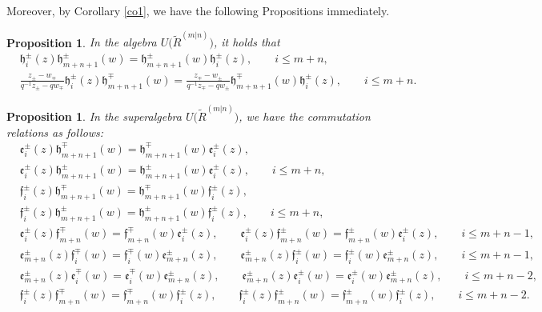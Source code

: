 \documentclass[pdftex]{sigma}
\numberwithin{equation}{section}
\newtheorem{Proposition}[Theorem]{Proposition}
 { \theoremstyle{definition}
\newtheorem{Definition}[Theorem]{Definition}
\newtheorem{Note}[Theorem]{Note}
\newtheorem{Example}[Theorem]{Example}
\newtheorem{Remark}[Theorem]{Remark} }
\begin{document}
Moreover, by Corollary \ref{co1}, we have the following Propositions immediately.
\begin{Proposition}In the algebra $U\bigl(\widetilde{R}^{(m|n)}\bigr)$, it holds that
\begin{align*}
&\mathfrak{h}_i^{\pm}(z)\mathfrak{h}_{m+n+1}^{\pm}(w)=\mathfrak{h}_{m+n+1}^{\pm}(w)\mathfrak{h}_i^{\pm}(z),\qquad i\leq m+n,\\
&\frac{z_{\pm}-w_{\mp}}{q^{-1}z_{\pm}-qw_{\mp}}\mathfrak{h}_i^{\pm}(z)\mathfrak{h}_{m+n+1}^{\mp}(w)=\frac{z_{\mp}-w_{\pm}}{q^{-1}z_{\mp}-qw_{\pm}}\mathfrak{h}_{m+n+1}^{\mp}(w)\mathfrak{h}_i^{\pm}(z),\qquad i\leq m+n.
\end{align*}
\end{Proposition}
\begin{Proposition}In the superalgebra $U\bigl(\widetilde{R}^{(m|n)}\bigr)$, we have the commutation relations as follows:
\begin{align*}
&\mathfrak{e}_i^{\pm}(z)\mathfrak{h}_{m+n+1}^{\mp}(w)=\mathfrak{h}_{m+n+1}^{\mp}(w)\mathfrak{e}_i^{\pm}(z),\\ &\mathfrak{e}_i^{\pm}(z)\mathfrak{h}_{m+n+1}^{\pm}(w)=\mathfrak{h}_{m+n+1}^{\pm}(w)\mathfrak{e}_i^{\pm}(z),\qquad i\leq m+n,\\
&\mathfrak{f}_i^{\pm}(z)\mathfrak{h}_{m+n+1}^{\mp}(w)=\mathfrak{h}_{m+n+1}^{\mp}(w)\mathfrak{f}_i^{\pm}(z),\\ &\mathfrak{f}_i^{\pm}(z)\mathfrak{h}_{m+n+1}^{\pm}(w)=\mathfrak{h}_{m+n+1}^{\pm}(w)\mathfrak{f}_i^{\pm}(z),\qquad i\leq m+n,\\
&\mathfrak{e}_i^{\pm}(z)\mathfrak{f}_{m+n}^{\mp}(w)=\mathfrak{f}_{m+n}^{\mp}(w)\mathfrak{e}_i^{\pm}(z),\qquad \mathfrak{e}_i^{\pm}(z)\mathfrak{f}_{m+n}^{\pm}(w)=\mathfrak{f}_{m+n}^{\pm}(w)\mathfrak{e}_i^{\pm}(z),\qquad i\leq m+n-1,\\
&\mathfrak{e}_{m+n}^{\pm}(z)\mathfrak{f}_i^{\mp}(w)=\mathfrak{f}_i^{\mp}(w)\mathfrak{e}_{m+n}^{\pm}(z),\qquad \mathfrak{e}_{m+n}^{\pm}(z)\mathfrak{f}_i^{\pm}(w)=\mathfrak{f}_i^{\pm}(w)\mathfrak{e}_{m+n}^{\pm}(z), \qquad i\leq m+n-1,\\
&\mathfrak{e}_{m+n}^{\pm}(z)\mathfrak{e}_i^{\mp}(w)=\mathfrak{e}_i^{\mp}(w)\mathfrak{e}_{m+n}^{\pm}(z),\qquad \mathfrak{e}_{m+n}^{\pm}(z)\mathfrak{e}_i^{\pm}(w)=\mathfrak{e}_i^{\pm}(w)\mathfrak{e}_{m+n}^{\pm}(z), \qquad i\leq m+n-2,\\
&\mathfrak{f}_i^{\pm}(z)\mathfrak{f}_{m+n}^{\mp}(w)=\mathfrak{f}_{m+n}^{\mp}(w)\mathfrak{f}_i^{\pm}(z),\qquad \mathfrak{f}_i^{\pm}(z)\mathfrak{f}_{m+n}^{\pm}(w)=\mathfrak{f}_{m+n}^{\pm}(w)\mathfrak{f}_i^{\pm}(z),\qquad i\leq m+n-2.
\end{align*}
\end{Proposition}
\end{document}
